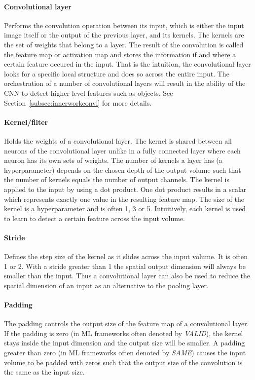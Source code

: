 \documentclass[12pt,a4paper]{article}
\begin{document}
\paragraph{Convolutional layer} Performs the convolution operation between its input, which is either the input image itself or the output of the previous layer, and its kernels. The kernels are the set of weights that belong to a layer. The result of the convolution is called the feature map or activation map and stores the information if and where a certain feature occured in the input. That is the intuition, the convolutional layer looks for a specific local structure and does so across the entire input. The orchestration of a number of convolutional layers will result in the ability of the CNN to detect higher level features such as objects. See Section~\ref{subsec:innerworkconvl} for more details.

\paragraph{Kernel/filter            } Holds the weights of a convolutional layer. The kernel is shared between all neurons of the convolutional layer unlike in a fully connected layer where each neuron has its own sets of weights. The number of kernels a layer has (a hyperparameter) depends on the chosen depth of the output volume such that the number of kernels equals the number of output channels. The kernel is applied to the input by using a dot product. One dot product results in a scalar which represents exactly one value in the resulting feature map. The size of the kernel is a hyperparameter and is often 1, 3 or 5. Intuitively, each kernel is used to learn to detect a certain feature across the input volume.

\paragraph{Stride                   } Defines the step size of the kernel as it slides across the input volume. It is often 1 or 2. With a stride greater than 1 the spatial output dimension will always be smaller than the input. Thus a convolutional layer can also be used to reduce the spatial dimension of an input as an alternative to the pooling layer.

\paragraph{Padding					} The padding controls the output size of the feature map of a convolutional layer. If the padding is zero (in ML frameworks often denoted by \textit{VALID}), the kernel stays inside the input dimension and the output size will be smaller. A padding greater than zero (in ML frameworks often denoted by \textit{SAME}) causes the input volume to be padded with zeros such that the output size of the convolution is the same as the input size.
\end{document}
